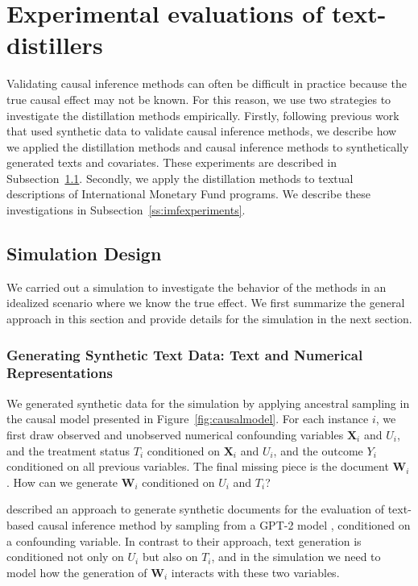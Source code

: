 \documentclass[11pt]{article}
\newcommand{\bW}{\bm{W}}  %
\begin{document}
\section{Experimental evaluations of text-distillers}

Validating causal inference methods can often be difficult in practice because the true causal effect may not be known. For this reason, we use two strategies to investigate the distillation methods empirically.
Firstly, following previous work that used synthetic data to validate causal inference methods, we describe how we applied the distillation methods and causal inference methods to synthetically generated texts and covariates. These experiments are described in Subsection~\ref{ss:simulations}.
%
Secondly, we apply the distillation methods to textual descriptions of International Monetary Fund programs.
We describe these investigations in Subsection~\ref{ss:imfexperiments}.

\subsection{Simulation Design}
\label{ss:simulations}

We carried out a simulation to investigate the behavior of the methods in an idealized scenario where we know the true effect.
We first summarize the general approach in this section and provide details for the simulation in the next section.

\subsubsection{Generating Synthetic Text Data: Text and Numerical Representations}

We generated synthetic data for the simulation by applying ancestral sampling in the causal model presented in Figure~\ref{fig:causalmodel}.
%
For each instance $i$, we first draw observed and unobserved numerical confounding variables $\bm{X}_i$ and $U_i$, and the treatment status $T_i$ conditioned on $\bm{X}_i$ and $U_i$, and the outcome $Y_i$ conditioned on all previous variables.
%
The final missing piece is the document $\bm{W}_i$. How can we generate $\bm{W}_i$ conditioned on $U_i$ and $T_i$?

\citet{wooddoughty2021} described an approach to generate synthetic documents for the evaluation of text-based causal inference method by sampling from a GPT-2 model \citep{radford2019}, conditioned on a confounding variable.
In contrast to their approach, text generation is conditioned not only on $U_i$ but also on $T_i$, and in the simulation we need to model how the generation of $\bm{W}_i$ interacts with these two variables.
%
\end{document}
